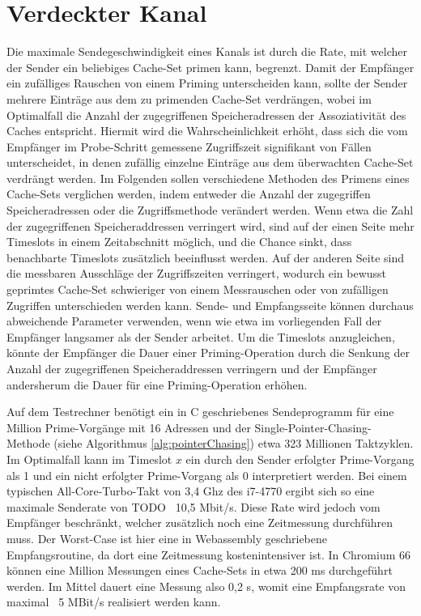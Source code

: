 \section{Verdeckter Kanal}

Die maximale Sendegeschwindigkeit eines Kanals ist durch die Rate, mit welcher der Sender ein beliebiges Cache-Set primen kann, begrenzt.
Damit der Empfänger ein zufälliges Rauschen von einem Priming unterscheiden kann, sollte der Sender mehrere Einträge aus dem zu primenden Cache-Set verdrängen, wobei im Optimalfall die Anzahl der zugegriffenen Speicheradressen der Assoziativität des Caches entspricht.
Hiermit wird die Wahrscheinlichkeit erhöht, dass sich die vom Empfänger im Probe-Schritt gemessene Zugriffszeit signifikant von Fällen unterscheidet, in denen zufällig einzelne Einträge aus dem überwachten Cache-Set verdrängt werden. 
Im Folgenden sollen verschiedene Methoden des Primens eines Cache-Sets verglichen werden, indem entweder die Anzahl der zugegriffen Speicheradressen oder die Zugriffsmethode verändert werden.
Wenn etwa die Zahl der zugegriffenen Speicheraddressen verringert wird, sind auf der einen Seite mehr Timeslots in einem Zeitabschnitt möglich, und die Chance sinkt, dass benachbarte Timeslots zusätzlich beeinflusst werden. Auf der anderen Seite sind die messbaren Ausschläge der Zugriffszeiten verringert, wodurch ein bewusst geprimtes Cache-Set schwieriger von einem Messrauschen oder von zufälligen Zugriffen unterschieden werden kann.
Sende- und Empfangsseite können durchaus abweichende Parameter verwenden, wenn wie etwa im vorliegenden Fall der Empfänger langsamer als der Sender arbeitet. Um die Timeslots anzugleichen, könnte der Empfänger die Dauer einer Priming-Operation durch die Senkung der Anzahl der zugegriffenen Speicheraddressen verringern und der Empfänger andersherum die Dauer für eine Priming-Operation erhöhen. 

Auf dem Testrechner benötigt ein in C geschriebenes Sendeprogramm für eine Million Prime-Vorgänge mit 16 Adressen und der Single-Pointer-Chasing-Methode (siehe Algorithmus \ref{alg:pointerChasing}) etwa 323 Millionen Taktzyklen.
Im Optimalfall kann im Timeslot $x$ ein durch den Sender erfolgter Prime-Vorgang als 1 und ein nicht erfolgter Prime-Vorgang  als 0 interpretiert werden.
Bei einem typischen All-Core-Turbo-Takt von 3,4 Ghz des i7-4770 ergibt sich so eine maximale Senderate von TODO ~10,5 Mbit/s.
Diese Rate wird jedoch vom Empfänger beschränkt, welcher zusätzlich noch eine Zeitmessung durchführen muss. Der Worst-Case ist hier eine in Webassembly geschriebene Empfangsroutine, da dort eine Zeitmessung kostenintensiver ist. In Chromium 66 können eine Million Messungen eines Cache-Sets in etwa 200 ms durchgeführt werden.
Im Mittel dauert eine Messung also 0,2 \textmu s, womit eine Empfangsrate von maximal ~5 MBit/s realisiert werden kann.


